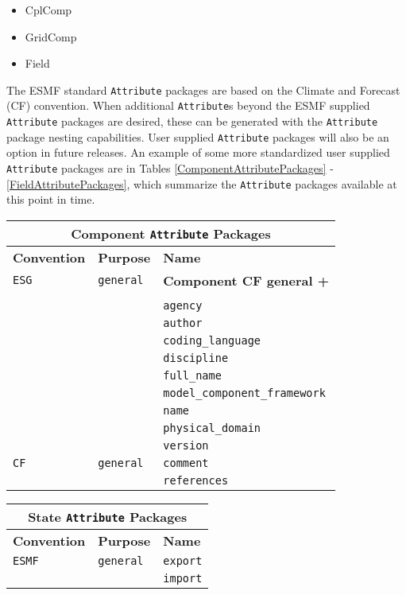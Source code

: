 \begin{itemize}
\item CplComp
\item GridComp
\item Field
\end{itemize}

The ESMF standard {\tt Attribute} packages are based on the Climate and Forecast (CF) convention.  When additional {\tt Attribute}s beyond the ESMF supplied {\tt Attribute} packages are desired, these can be generated with the {\tt Attribute} package nesting capabilities.  User supplied {\tt Attribute} packages will also be an option in future releases.  An example of some more standardized user supplied {\tt Attribute} packages are in Tables \ref{ComponentAttributePackages} - \ref{FieldAttributePackages}, which summarize the {\tt Attribute} packages available at this point in time.

\vspace{18pt}

\begin{tabular}{|p{4cm}|p{4cm}|p{6cm}|}
\hline
\multicolumn{3}{|c|}{{\bf \large Component {\tt Attribute} Packages}} \\
\hline\hline
{\bf Convention} & {\bf Purpose} & {\bf Name} \\
\hline\hline
{\tt ESG} & {\tt general} & {\bf Component CF general +} \\
     & & \\
     & & {\tt agency} \\
     & & {\tt author} \\
     & & {\tt coding\_language}  \\
     & & {\tt discipline}  \\
     & & {\tt full\_name} \\
     & & {\tt model\_component\_framework} \\
     & & {\tt name} \\
     & & {\tt physical\_domain}\\
     & & {\tt version} \\ 
\hline
{\tt CF} & {\tt general} & {\tt comment}\\
     & & {\tt references} \\
\hline
\end{tabular}
\label{ComponentAttributePackages}

\vspace{18pt}

\begin{tabular}{|p{4cm}|p{4cm}|p{6cm}|}
\hline
\multicolumn{3}{|c|}{{\bf \large State {\tt Attribute} Packages}} \\
\hline\hline
{\bf Convention} & {\bf Purpose} & {\bf Name} \\
\hline\hline
{\tt ESMF} & {\tt general} & {\tt export}  \\
 & & {\tt import} \\ 
\hline
\end{tabular}
\label{StateAttributePackages}

